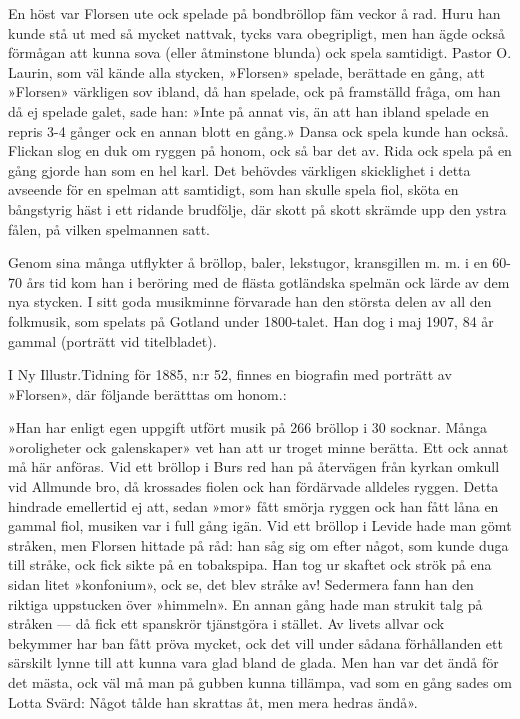 En höst var Florsen ute ock spelade på bondbröllop fäm veckor å rad. Huru han kunde stå ut med så mycket nattvak, tycks vara obegripligt, men han ägde också förmågan att kunna sova (eller åtminstone blunda) ock spela samtidigt. Pastor O. Laurin, som väl kände alla stycken, »Florsen» spelade, berättade en gång, att »Florsen» värkligen sov ibland, då han spelade, ock på framställd fråga, om han då ej spelade galet, sade han: »Inte på annat vis, än att han ibland spelade en repris 3-4 gånger ock en annan blott en gång.» Dansa ock spela kunde han också. Flickan slog en duk om ryggen på honom, ock så bar det av. Rida ock spela på en gång gjorde han som en hel karl. Det behövdes värkligen skicklighet i detta avseende för en spelman att samtidigt, som han skulle spela fiol, sköta en bångstyrig häst i ett ridande brudfölje, där skott på skott skrämde upp den ystra fålen, på vilken spelmannen satt. 

Genom sina många utflykter å bröllop, baler, lekstugor, kransgillen m. m. i en 60-70 års tid kom han i beröring med de flästa gotländska spelmän ock lärde av dem nya stycken. I sitt goda musikminne förvarade han den största delen av all den folkmusik, som spelats på Gotland under 1800-talet. Han dog i maj 1907, 84 år gammal (porträtt vid titelbladet). 

I Ny Illustr.\@ Tidning för 1885, n:r 52, finnes en biografin med porträtt av »Florsen», där följande berätttas om honom.: 

»Han har enligt egen uppgift utfört musik på 266 bröllop i 30 socknar. Många »oroligheter ock galenskaper» vet han att ur troget minne berätta. Ett ock annat må här anföras. Vid ett bröllop i Burs red han på återvägen från kyrkan omkull vid Allmunde bro, då krossades fiolen ock han fördärvade alldeles ryggen. Detta hindrade emellertid ej att, sedan »mor» fått smörja ryggen ock han fått låna en gammal fiol, musiken var i full gång igän. Vid ett bröllop i Levide hade man gömt stråken, men Florsen hittade på råd: han såg sig om efter något, som kunde duga till stråke, ock fick sikte på en tobakspipa. Han tog ur skaftet ock strök på ena sidan litet »konfonium», ock se, det blev stråke av! Sedermera fann han den riktiga uppstucken över »himmeln». En annan gång hade man strukit talg på stråken --- då fick ett spanskrör tjänstgöra i stället. Av livets allvar ock bekymmer har ban fått pröva mycket, ock det vill under sådana förhållanden ett särskilt lynne till att kunna vara glad bland de glada. Men han var det ändå för det mästa, ock väl må man på gubben kunna tillämpa, vad som en gång sades om Lotta Svärd: Något tålde han skrattas åt, men mera hedras ändå». 

